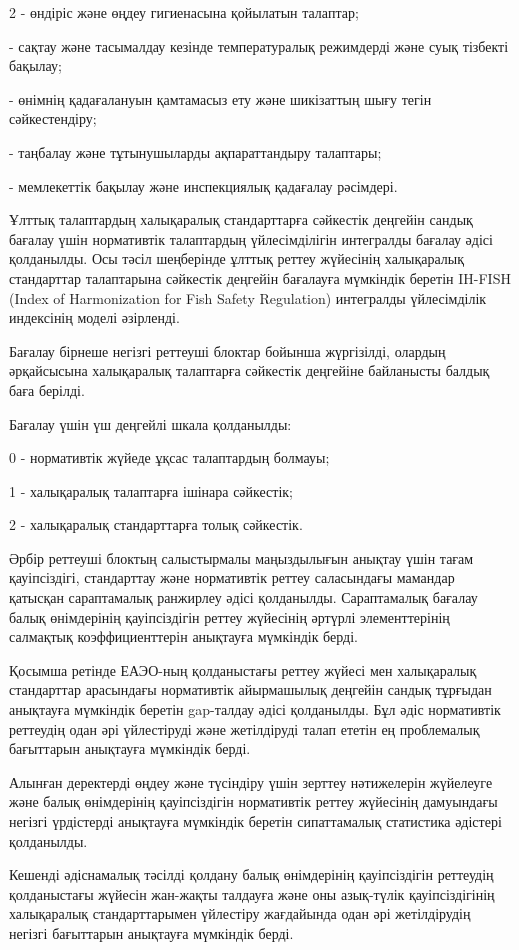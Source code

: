 \begin{multicols}{2}
- өндіріс және өңдеу гигиенасына қойылатын талаптар;

- сақтау және тасымалдау кезінде температуралық режимдерді және суық
тізбекті бақылау;

- өнімнің қадағалануын қамтамасыз ету және шикізаттың шығу тегін
сәйкестендіру;

- таңбалау және тұтынушыларды ақпараттандыру талаптары;

- мемлекеттік бақылау және инспекциялық қадағалау рәсімдері.

Ұлттық талаптардың халықаралық стандарттарға сәйкестік деңгейін сандық
бағалау үшін нормативтік талаптардың үйлесімділігін интегралды бағалау
әдісі қолданылды. Осы тәсіл шеңберінде ұлттық реттеу жүйесінің
халықаралық стандарттар талаптарына сәйкестік деңгейін бағалауға
мүмкіндік беретін IH-FISH (Index of Harmonization for Fish Safety
Regulation) интегралды үйлесімділік индексінің моделі әзірленді.

Бағалау бірнеше негізгі реттеуші блоктар бойынша жүргізілді, олардың
әрқайсысына халықаралық талаптарға сәйкестік деңгейіне байланысты балдық
баға берілді.

Бағалау үшін үш деңгейлі шкала қолданылды:

0 - нормативтік жүйеде ұқсас талаптардың болмауы;

1 - халықаралық талаптарға ішінара сәйкестік;

2 - халықаралық стандарттарға толық сәйкестік.

Әрбір реттеуші блоктың салыстырмалы маңыздылығын анықтау үшін тағам
қауіпсіздігі, стандарттау және нормативтік реттеу саласындағы мамандар
қатысқан сараптамалық ранжирлеу әдісі қолданылды. Сараптамалық бағалау
балық өнімдерінің қауіпсіздігін реттеу жүйесінің әртүрлі элементтерінің
салмақтық коэффициенттерін анықтауға мүмкіндік берді.

Қосымша ретінде ЕАЭО-ның қолданыстағы реттеу жүйесі мен халықаралық
стандарттар арасындағы нормативтік айырмашылық деңгейін сандық тұрғыдан
анықтауға мүмкіндік беретін gap-талдау әдісі қолданылды. Бұл әдіс
нормативтік реттеудің одан әрі үйлестіруді және жетілдіруді талап ететін
ең проблемалық бағыттарын анықтауға мүмкіндік берді.

Алынған деректерді өңдеу және түсіндіру үшін зерттеу нәтижелерін
жүйелеуге және балық өнімдерінің қауіпсіздігін нормативтік реттеу
жүйесінің дамуындағы негізгі үрдістерді анықтауға мүмкіндік беретін
сипаттамалық статистика әдістері қолданылды.

Кешенді әдіснамалық тәсілді қолдану балық өнімдерінің қауіпсіздігін
реттеудің қолданыстағы жүйесін жан-жақты талдауға және оны азық-түлік
қауіпсіздігінің халықаралық стандарттарымен үйлестіру жағдайында одан
әрі жетілдірудің негізгі бағыттарын анықтауға мүмкіндік берді.


\end{multicols}

